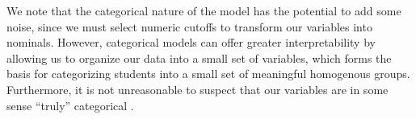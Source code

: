 \documentclass{edm_template}
\begin{document}
We note that the categorical nature of the model has the potential to add some noise, since we must select numeric cutoffs to transform our variables into nominals. However, categorical models can offer greater interpretability by allowing us to organize our data into a small set of variables, which forms the basis for categorizing students into a small set of meaningful homogenous groups. Furthermore, it is not unreasonable to suspect that our variables are in some sense ``truly'' categorical \cite[pp8--9]{Collins2009}. 



\end{document}
